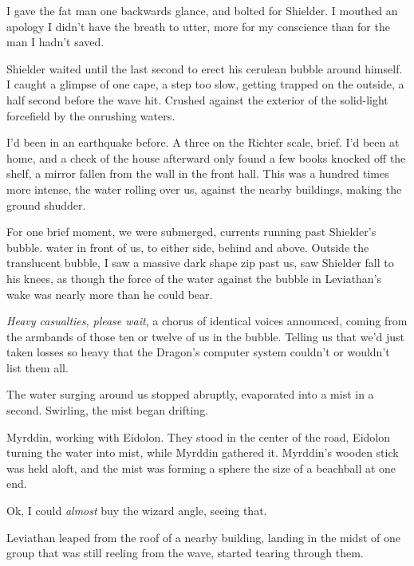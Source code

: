 I gave the fat man one backwards glance, and bolted for Shielder. I mouthed an apology I didn't have the breath to utter, more for my conscience than for the man I hadn't saved.



Shielder waited until the last second to erect his cerulean bubble around himself.  I caught a glimpse of one cape, a step too slow, getting trapped on the outside, a half second before the wave hit.  Crushed against the exterior of the solid-light forcefield by the onrushing waters.



I'd been in an earthquake before.  A three on the Richter scale, brief.  I'd been at home, and a check of the house afterward only found a few books knocked off the shelf, a mirror fallen from the wall in the front hall.  This was a hundred times more intense, the water rolling over us, against the nearby buildings, making the ground shudder.



For one brief moment, we were submerged, currents running past Shielder's bubble.  water in front of us, to either side, behind and above.  Outside the translucent bubble, I saw a massive dark shape zip past us, saw Shielder fall to his knees, as though the force of the water against the bubble in Leviathan's wake was nearly more than he could bear.



\emph{Heavy casualties}\emph{, }\emph{please wait}, a chorus of identical voices announced, coming from the armbands of those ten or twelve of us in the bubble.  Telling us that we'd just taken losses so heavy that the Dragon's computer system couldn't or wouldn't list them all.



The water surging around us stopped abruptly, evaporated into a mist in a second.  Swirling, the mist began drifting.



Myrddin, working with Eidolon. They stood in the center of the road, Eidolon turning the water into mist, while Myrddin gathered it.  Myrddin's wooden stick was held aloft, and the mist was forming a sphere the size of a beachball at one end.



Ok, I could \emph{almost} buy the wizard angle, seeing that.



Leviathan leaped from the roof of a nearby building, landing in the midst of one group that was still reeling from the wave, started tearing through them.



